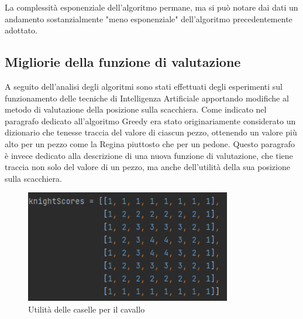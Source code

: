 La complessità esponenziale dell'algoritmo permane, ma si può notare dai dati un andamento sostanzialmente "meno esponenziale" dell'algoritmo precedentemente adottato.

\subsection{Migliorie della funzione di valutazione}
A seguito dell'analisi degli algoritmi sono stati effettuati degli esperimenti sul funzionamento delle tecniche di Intelligenza Artificiale apportando modifiche al metodo di valutazione della posizione sulla scacchiera. Come indicato nel paragrafo dedicato all'algoritmo Greedy era stato originariamente considerato un dizionario che tenesse traccia del valore di ciascun pezzo, ottenendo un valore più alto per un pezzo come la Regina piuttosto che per un pedone. Questo paragrafo è invece dedicato alla descrizione di una nuova funzione di valutazione, che tiene traccia non solo del valore di un pezzo, ma anche dell'utilità della sua posizione sulla scacchiera.

\begin{figure}[!htb]
    \includegraphics[width=9cm]{frontmatter/figure/cavallo.pdf}
    \centering
    \caption{Utilità delle caselle per il cavallo}
    \label{fig:valore_cavallo}
\end{figure}


